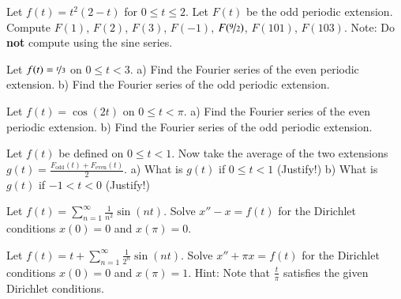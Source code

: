 \documentclass[12pt]{book}
\begin{document}
\begin{exercise}
Let $f(t) = t^2(2-t)$ for $0 \leq t \leq 2$.  Let $F(t)$ be the odd periodic
extension.  Compute $F(1)$, $F(2)$, $F(3)$, $F(-1)$, $F(\nicefrac{9}{2})$,
$F(101)$, $F(103)$.  Note: Do \textbf{not} compute using the sine series.
\end{exercise}

\setcounter{exercise}{100}

\begin{exercise}
Let $f(t) = \nicefrac{t}{3}$ on $0 \leq t < 3$.  a) Find the Fourier series of
the even periodic extension.  b) Find the Fourier series of the odd
periodic extension.
\end{exercise}

\begin{exercise}
Let $f(t) = \cos(2t)$ on $0 \leq t < \pi$.  a) Find the Fourier series of
the even periodic extension.  b) Find the Fourier series of the odd
periodic extension.
\end{exercise}

\begin{exercise}
Let $f(t)$ be defined on $0 \leq t < 1$.  Now take
the average of the two extensions
$g(t) = \frac{F_{\text{odd}}(t)+ F_{\text{even}}(t)}{2}$.
a) What is $g(t)$ if $0 \leq t < 1$ (Justify!)
b) What is $g(t)$ if $-1 < t < 0$ (Justify!)
\end{exercise}

\begin{exercise}
Let $f(t) = \sum_{n=1}^\infty \frac{1}{n^2} \sin(nt)$.  Solve
$x''- x = f(t)$ for the Dirichlet conditions $x(0) = 0$
and $x(\pi) = 0$.
\end{exercise}

\begin{exercise}[challenging]
Let $f(t) = t + \sum_{n=1}^\infty \frac{1}{2^n} \sin(nt)$.  Solve
$x'' + \pi x = f(t)$ for the Dirichlet conditions $x(0) = 0$
and $x(\pi) = 1$.  Hint:  Note that $\frac{t}{\pi}$ satisfies the
given Dirichlet conditions.
\end{exercise}
\end{document}
